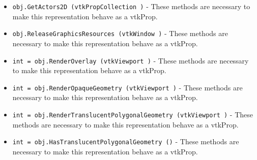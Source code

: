 \begin{itemize}
\item  \verb|obj.GetActors2D (vtkPropCollection )| -  These methods are necessary to make this representation behave as
 a vtkProp.

\item  \verb|obj.ReleaseGraphicsResources (vtkWindow )| -  These methods are necessary to make this representation behave as
 a vtkProp.

\item  \verb|int = obj.RenderOverlay (vtkViewport )| -  These methods are necessary to make this representation behave as
 a vtkProp.

\item  \verb|int = obj.RenderOpaqueGeometry (vtkViewport )| -  These methods are necessary to make this representation behave as
 a vtkProp.

\item  \verb|int = obj.RenderTranslucentPolygonalGeometry (vtkViewport )| -  These methods are necessary to make this representation behave as
 a vtkProp.

\item  \verb|int = obj.HasTranslucentPolygonalGeometry ()| -  These methods are necessary to make this representation behave as
 a vtkProp.

\end{itemize}
